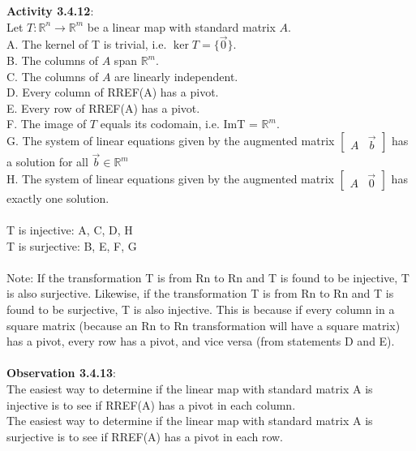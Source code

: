 \documentclass{article}
\begin{document}
\noindent \textbf{Activity 3.4.12}:\\
Let $T: \mathbb{R}^n \to \mathbb{R}^m$ be a linear map with standard matrix $A$. \\
A. The kernel of T is trivial, i.e. $\ker T=\{\vec 0\}$.\\
B. The columns of $A$ span $\mathbb{R}^m$.\\
C. The columns of $A$ are linearly independent.\\
D. Every column of RREF(A) has a pivot.\\
E. Every row of RREF(A) has a pivot.\\
F. The image of $T$ equals its codomain, i.e. ImT = $\mathbb{R}^m$.\\
G. The system of linear equations given by the augmented matrix $\left[\begin{array}{c|c}A & \vec{b} \end{array}\right]$ has a solution for all $\vec{b} \in \mathbb{R}^m$\\
H. The system of linear equations given by the augmented matrix $\left[\begin{array}{c|c}A & \vec{0} \end{array}\right]$ has exactly one solution.\\
\\
T is injective: A, C, D, H \\
T is surjective: B, E, F, G \\
\\
Note: If the transformation T is from Rn to Rn and T is found to be injective, T is also surjective. Likewise, if the transformation T is from Rn to Rn and T is found to be surjective, T is also injective. This is because if every column in a square matrix (because an  Rn to Rn transformation will have a square matrix) has a pivot, every row has a pivot, and vice versa (from statements D and E). \\
\\
\noindent \textbf{Observation 3.4.13}:\\
The easiest way to determine if the linear map with standard matrix A is injective is to see if RREF(A) has a pivot in each column.\\
The easiest way to determine if the linear map with standard matrix A is surjective is to see if RREF(A) has a pivot in each row.\\
\end{document}
